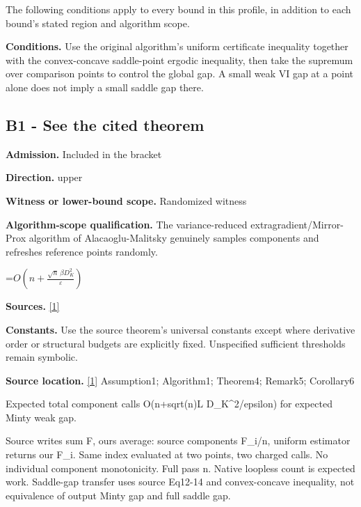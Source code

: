 \documentclass[10pt,a4paper]{article}
\newcommand{\AtlasMath}[1]{\par\begingroup\centering\setbox0=\hbox{$\displaystyle #1$}\ifdim\wd0>1.4\linewidth\typeout{ATLAS WIDE FORMULA: \the\wd0}\fi\ifdim\wd0>\linewidth\resizebox{\linewidth}{!}{\box0}\else\box0\fi\par\endgroup}
\begin{document}
The following conditions apply to every bound in this profile, in addition to each bound's stated region and algorithm scope.



\textbf{Conditions.} Use the original algorithm’s uniform certificate inequality together with the convex-concave saddle-point ergodic inequality, then take the supremum over comparison points to control the global gap. A small weak VI gap at a point alone does not imply a small saddle gap there.



\subsection{B1 - See the cited theorem}


\textbf{Admission.} Included in the bracket



\textbf{Direction.} upper



\textbf{Witness or lower-bound scope.} Randomized witness



\textbf{Algorithm-scope qualification.} The variance-reduced extragradient/Mirror-Prox algorithm of Alacaoglu-Malitsky genuinely samples components and refreshes reference points randomly.



\AtlasMath{O\!\left(n+\frac{\sqrt n\,\beta D_K^2}{\varepsilon}\right)}


\textbf{Sources.} \href{https://proceedings.mlr.press/v178/alacaoglu22a/alacaoglu22a.pdf}{[1]}



\textbf{Constants.} Use the source theorem’s universal constants except where derivative order or structural budgets are explicitly fixed. Unspecified sufficient thresholds remain symbolic.



\textbf{Source location.} \href{https://proceedings.mlr.press/v178/alacaoglu22a/alacaoglu22a.pdf}{[1]} Assumption1; Algorithm1; Theorem4; Remark5; Corollary6



Expected total component calls O(n+sqrt(n)L D\_K\textasciicircum{}2/epsilon) for expected Minty weak gap.



Source writes sum F, ours average: source components F\_i/n, uniform estimator returns our F\_i. Same index evaluated at two points, two charged calls. No individual component monotonicity. Full pass n. Native loopless count is expected work. Saddle-gap transfer uses source Eq12-14 and convex-concave inequality, not equivalence of output Minty gap and full saddle gap.
\end{document}
